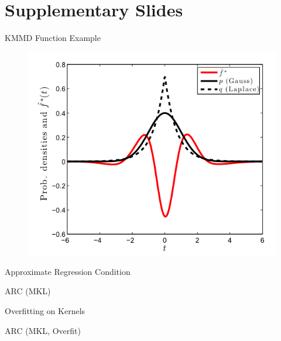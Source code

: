 \documentclass{beamer}
\begin{document}
\section{Supplementary Slides}
\begin{frame}{KMMD Function Example}
  \begin{figure}
    \centering
    \includegraphics[scale=.45]{kmmd.png}
  \end{figure}
\end{frame}

\begin{frame}{Approximate Regression Condition}
  \begin{figure}
    \centering
    \resizebox{9.0cm}{!}{
      
    }
  \end{figure}
\end{frame}

\begin{frame}{ARC (MKL)}
  \begin{figure}
    \centering
    \resizebox{9.0cm}{!}{
      
    }
  \end{figure}
\end{frame}

\begin{frame}{Overfitting on Kernels}
  \begin{figure}
    \centering
    \resizebox{9.0cm}{!}{
      
    }
  \end{figure}
\end{frame}

\begin{frame}{ARC (MKL, Overfit)}
  \begin{figure}
    \centering
    \resizebox{9.0cm}{!}{
      
    }
  \end{figure}
\end{frame}

\end{document}
